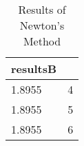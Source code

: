 \begin{table}
\center
\begin{tabular}{l|l}
resultsB \\ 
\hline 
1.8955&4 \\ 
1.8955&5 \\ 
1.8955&6 \\ 
\hline 
\end{tabular}
\caption{Results of Newton's Method}
\end{table}